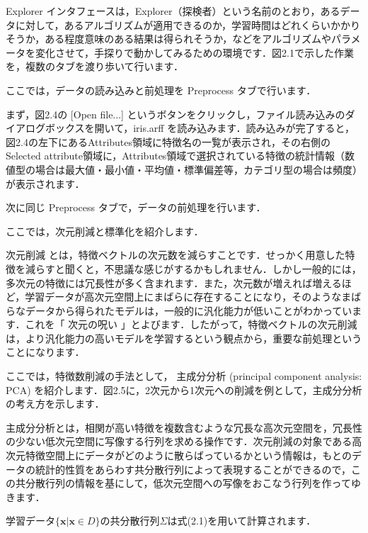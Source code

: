 
Explorer インタフェースは，Explorer（探検者）という名前のとおり，あるデータに対して，あるアルゴリズムが適用できるのか，学習時間はどれくらいかかりそうか，ある程度意味のある結果は得られそうか，などをアルゴリズムやパラメータを変化させて，手探りで動かしてみるための環境です．図2.1で示した作業を，複数のタブを渡り歩いて行います．

ここでは，データの読み込みと前処理を Preprocess タブで行います．

まず，図2.4の [Open file...] というボタンをクリックし，ファイル読み込みのダイアログボックスを開いて，iris.arff を読み込みます．読み込みが完了すると，図2.4の左下にあるAttributes領域に特徴名の一覧が表示され，その右側のSelected attribute領域に，Attributes領域で選択されている特徴の統計情報（数値型の場合は最大値・最小値・平均値・標準偏差等，カテゴリ型の場合は頻度）が表示されます．

次に同じ Preprocess タブで，データの前処理を行います．


ここでは，次元削減と標準化を紹介します．

次元削減
とは，特徴ベクトルの次元数を減らすことです．せっかく用意した特徴を減らすと聞くと，不思議な感じがするかもしれません．しかし一般的には，多次元の特徴には冗長性が多く含まれます．また，次元数が増えれば増えるほど，学習データが高次元空間上にまばらに存在することになり，そのようなまばらなデータから得られたモデルは，一般的に汎化能力が低いことがわかっています．これを「
次元の呪い
」とよびます．したがって，特徴ベクトルの次元削減は，より汎化能力の高いモデルを学習するという観点から，重要な前処理ということになります．


ここでは，特徴数削減の手法として，
主成分分析 (principal component analysis: PCA) 
を紹介します．図2.5に，2次元から1次元への削減を例として，主成分分析の考え方を示します．


主成分分析とは，相関が高い特徴を複数含むような冗長な高次元空間を，冗長性の少ない低次元空間に写像する行列を求める操作です．次元削減の対象である高次元特徴空間上にデータがどのように散らばっているかという情報は，もとのデータの統計的性質をあらわす共分散行列によって表現することができるので，この共分散行列の情報を基にして，低次元空間への写像をおこなう行列を作ってゆきます．

学習データ$\{\bm{x} | \bm{x} \in D\}$の共分散行列$\Sigma$は式(2.1)を用いて計算されます．


